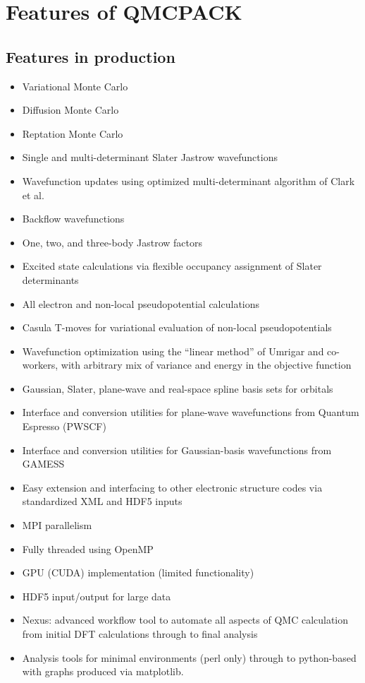 \chapter{Features of QMCPACK}
\label{chap:features}
\section{Features in production}
\begin{itemize}
\item Variational Monte Carlo
\item Diffusion Monte Carlo
\item Reptation Monte Carlo
\item Single and multi-determinant Slater Jastrow wavefunctions
\item Wavefunction updates using optimized multi-determinant algorithm of Clark et al.
\item Backflow wavefunctions
\item One, two, and three-body Jastrow factors
\item Excited state calculations via flexible occupancy assignment of Slater determinants
\item All electron and non-local pseudopotential calculations
\item Casula T-moves for variational evaluation of non-local pseudopotentials
\item Wavefunction optimization using the ``linear method'' of Umrigar and co-workers, with arbitrary mix of variance and energy in the objective function
\item Gaussian, Slater, plane-wave and real-space spline basis sets for orbitals
\item Interface and conversion utilities for plane-wave wavefunctions from Quantum Espresso (PWSCF)
\item Interface and conversion utilities for Gaussian-basis wavefunctions from GAMESS
\item Easy extension and interfacing to other electronic structure codes via standardized XML and HDF5 inputs
\item MPI parallelism
\item Fully threaded using OpenMP
\item GPU (CUDA) implementation (limited functionality)
\item HDF5 input/output for large data
\item Nexus: advanced workflow tool to automate all aspects of QMC calculation from initial DFT calculations through to final analysis
\item Analysis tools for minimal environments (perl only) through to python-based with graphs produced via matplotlib.
\end{itemize}

